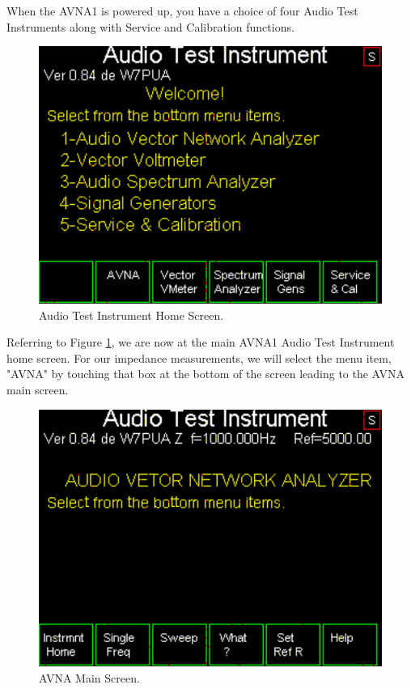 When the AVNA1 is powered up, you have a choice of four Audio Test Instruments along with Service and Calibration functions.
\begin{figure}[H]
\begin{center}
\includegraphics[scale=0.75]{./images/AVNA_000.pdf}
\caption{Audio Test Instrument Home  Screen.}
\label{AVNA_000-label}
\end{center}
\end{figure}
%
Referring to Figure \ref{AVNA_000-label}, we are now at the main AVNA1 Audio Test Instrument home screen.  For our impedance measurements, we will select the menu item, "\textsf{AVNA}" by touching that box at the bottom of the screen leading to the AVNA main screen.
\begin{figure}[H]
\begin{center}
\includegraphics[scale=0.75]{./images/AVNA_001.pdf}
\caption{AVNA Main  Screen.}
\label{AVNA_001-label}
\end{center}
\end{figure}
